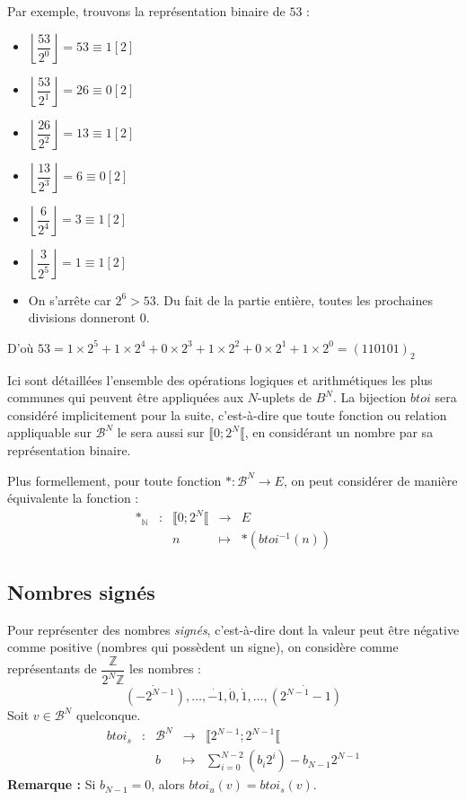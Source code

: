 \documentclass[../../main.tex]{subfiles}
\begin{document}
Par exemple, trouvons la représentation binaire de $53$ :
\begin{itemize}
     \item $\left\lfloor{\dfrac{53}{2^{0}}}\right\rfloor = 53 \equiv{1}[2]$
     \item $\left\lfloor{\dfrac{53}{2^{1}}}\right\rfloor = 26 \equiv{0}[2]$
     \item $\left\lfloor{\dfrac{26}{2^{2}}}\right\rfloor = 13 \equiv{1}[2]$
     \item $\left\lfloor{\dfrac{13}{2^{3}}}\right\rfloor = 6 \equiv{0}[2]$
     \item $\left\lfloor{\dfrac{6}{2^{4}}}\right\rfloor = 3 \equiv{1}[2]$
     \item $\left\lfloor{\dfrac{3}{2^{5}}}\right\rfloor = 1 \equiv{1}[2]$
     \item On s'arrête car $2^{6} > 53$. Du fait de la partie entière, toutes les prochaines divisions donneront 0.
\end{itemize}
D'où $53 = 1\times{2^{5}} + 1\times{2^{4}} + 0\times{2^{3}} + 1\times{2^{2}} + 0\times{2^{1}} + 1\times 2^{0} = (110101)_{2}$

Ici sont détaillées l'ensemble des opérations logiques et arithmétiques les plus communes qui peuvent être appliquées aux $N$-uplets de $B^{N}$. La bijection $btoi$ sera considéré implicitement pour la suite, c'est-à-dire que toute fonction ou relation appliquable sur $\mathcal{B}^{N}$ le sera aussi sur $\llbracket 0; 2^{N}\llbracket $, en considérant un nombre par sa représentation binaire.

Plus formellement, pour toute fonction $\ast : \mathcal{B}^{N} \rightarrow E$, on peut considérer de manière équivalente la fonction :
$$
\begin{array}{lclcl}
\ast_{\mathbb{N}} & : & \llbracket 0;2^{N}\llbracket  & \rightarrow & E \\
     &   & n & \mapsto & \ast{(btoi^{-1}{(n)})}
\end{array}
$$
\subsection{Nombres signés} \label{sub:nombres_sign_s}
Pour représenter des nombres \textit{signés}, c'est-à-dire dont la valeur peut être négative comme positive (nombres qui possèdent un signe), on considère comme représentants de $\dfrac{\mathbb{Z}}{2^{N}\mathbb{Z}}$ les nombres :
$$\dot{(-2^{N-1})}, \dots, \dot{-1}, \dot{0}, \dot{1}, \dots, \dot{(2^{N-1}-1)}$$
Soit $v\in{\mathcal{B}^{N}}$ quelconque.
$$
\begin{array}{lclcl}
btoi_{s} & : & \mathcal{B}^{N} & \rightarrow & \llbracket 2^{N-1}; 2^{N-1}\llbracket  \\
     &   & b & \mapsto & \displaystyle\sum_{i = 0}^{N-2}(b_{i}2^{i}) - b_{N-1}2^{N-1}
\end{array}
$$
\textbf{Remarque :} Si $b_{N-1} = 0$, alors $btoi_{u}(v) = btoi_{s}(v)$.
\end{document}
